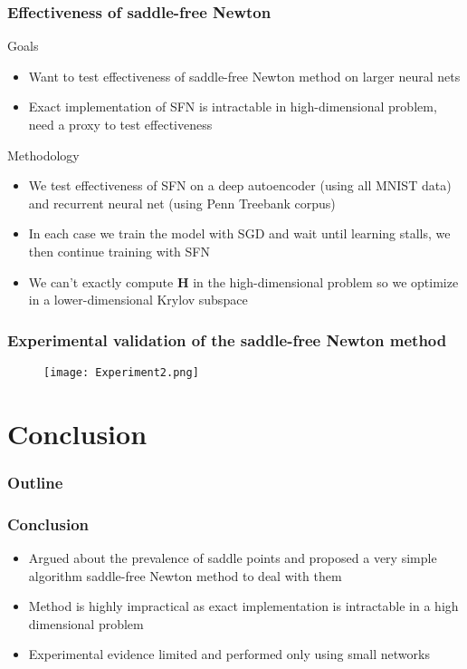\documentclass{beamer}
\begin{document}
\begin{frame}
\frametitle{Effectiveness of saddle-free Newton}
\pause
\begin{block}{Goals}
\begin{itemize}
\pause
\item{Want to test effectiveness of saddle-free Newton method on larger neural nets}
\pause
\item{Exact implementation of SFN is intractable in high-dimensional problem, need a proxy to test effectiveness}
\pause
\end{itemize}
\end{block}

\begin{block}{Methodology}
\begin{itemize}
\pause
\item{We test effectiveness of SFN on a deep autoencoder (using all MNIST data) and recurrent neural net (using Penn Treebank corpus)}
\pause
\item{In each case we train the model with SGD and wait until learning stalls, we then continue training with SFN}
\pause
\item{We can't exactly compute $\bm{H}$ in the high-dimensional problem so we optimize in a lower-dimensional Krylov subspace}
\end{itemize}
\end{block}

\end{frame}


\begin{frame}
\frametitle{Experimental validation of the saddle-free Newton method}
\begin{figure}
\texttt{[image: Experiment2.png]}
\end{figure}
\end{frame}




\section{Conclusion}
\begin{frame}
\frametitle{Outline}
\tableofcontents[currentsection]
\end{frame}


\begin{frame}
\frametitle{Conclusion}
\pause
\begin{itemize}
\item{Argued about the prevalence of saddle points and proposed a very simple algorithm saddle-free Newton method to deal with them}
\pause
\vspace{0.04in}
\item{Method is highly impractical as exact implementation is intractable in a high dimensional problem} 
\pause
\vspace{0.04in}
\item{Experimental evidence limited and performed only using small networks}
\vspace{0.04in}
\end{itemize}
\end{frame}
\end{document}

